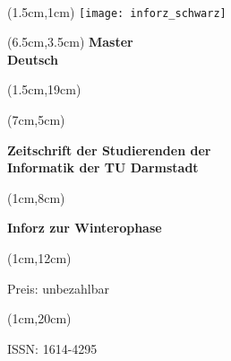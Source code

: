 \begin{titlepage}~


    \begin{textblock*}{12cm}(1.5cm,1cm)
        \texttt{[image: inforz\_schwarz]}
    \end{textblock*}


    \begin{textblock*}{12cm}(6.5cm,3.5cm)
        \centering\fontsize{25}{25}\sffamily\textbf{
            \textcolor{mycolor}{Master } \\
            \textcolor{mycolor}{Deutsch}}
    \end{textblock*}


    \begin{textblock*}{12cm}(1.5cm,19cm)
    \end{textblock*}

    \begin{textblock*}{7cm}(7cm,5cm)
        \begin{flushright}
            \large\sffamily\textbf{
                \textcolor{.}{Zeitschrift der Studierenden der}\\
                \textcolor{.}{Informatik der TU Darmstadt}}
        \end{flushright}
    \end{textblock*}



    \begin{textblock*}{5cm}(1cm,8cm)
        \begin{rotate}{90}
            \sffamily\huge\textbf{
                \textcolor{.}{Inforz zur Winterophase \the\year}}
        \end{rotate}
    \end{textblock*}


    \begin{textblock*}{2cm}(1cm,12cm)
        \begin{rotate}{90}
            \sffamily\tiny \textcolor{.}{Preis: unbezahlbar}
        \end{rotate}
    \end{textblock*}


    \begin{textblock*}{2cm}(1cm,20cm)
        \begin{rotate}{90}
            \sffamily \textcolor{.}{ISSN: 1614-4295}
        \end{rotate}
    \end{textblock*}
\end{titlepage}
